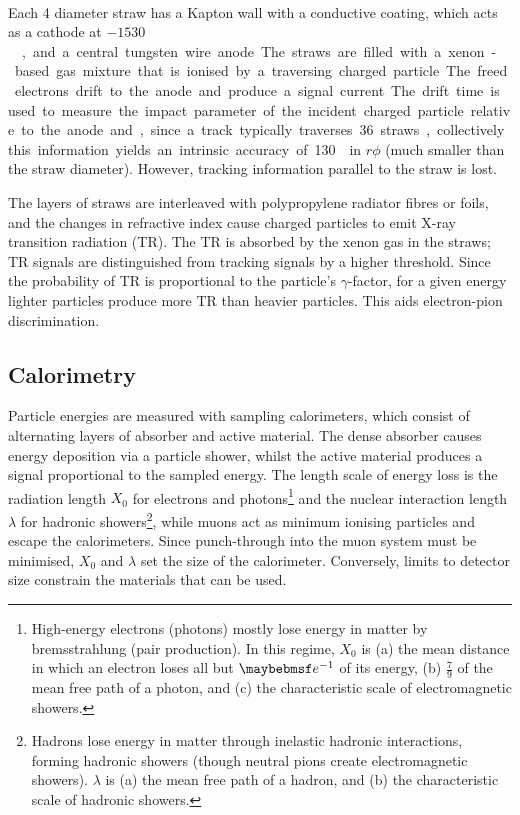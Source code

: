 \begin{description}
	Each \unit{4}{\milli\metre} diameter straw has a 
	Kapton\textsuperscript{\circledR}\xspace wall with a conductive coating, which 
	acts as a cathode at \unit{$-1530$}{\volt}, and a central tungsten wire anode. The 
	straws are filled with a xenon-based gas mixture that is ionised by a traversing 
	charged particle. The freed electrons drift to the anode and produce a signal current.
	The drift time is used to measure the impact parameter of the incident charged 
	particle relative to the anode and, since a track typically traverses 36 straws, 
	collectively this information yields an intrinsic accuracy of \unit{130}{\micro\metre}
	in $r\phi$ (much smaller than the straw diameter). However, tracking information 
	parallel to the straw is lost.

	The layers of straws are interleaved with polypropylene radiator fibres or foils, and 
	the changes in refractive index cause charged particles to emit X-ray transition 
	radiation (TR). The TR is absorbed by the xenon gas in the straws; TR signals are 
	distinguished from tracking signals by a higher threshold. Since the probability of 
	TR is proportional to the particle's $\gamma$-factor, for a given energy lighter 
	particles produce more TR than heavier particles. This aids electron-pion 
	discrimination.
\end{description}



\subsection{Calorimetry}

Particle energies are measured with sampling calorimeters, which consist of alternating 
layers of absorber and active material. The dense absorber causes energy deposition 
via a particle shower, whilst the active material produces a signal proportional to the 
sampled energy. The length scale of energy loss is the radiation length $X_0$ for 
electrons and photons\footnote{
	High-energy electrons (photons) mostly lose energy in matter by bremsstrahlung 
	(\epluseminus pair production). In this regime, $X_0$ is (a) the mean distance in 
	which an electron loses all but $\eexp{-1}$ of its energy, (b) $\tfrac{7}{9}$ of the 
	mean free path of a photon, and (c) the characteristic scale of electromagnetic 
	showers.
} and the nuclear interaction length $\lambda$ for hadronic showers\footnote{
	Hadrons lose energy in matter through inelastic hadronic interactions, forming hadronic showers (though neutral pions create electromagnetic showers). $\lambda$ is 
	(a) the mean free path of a hadron, and (b) the characteristic scale of hadronic showers.
}, while muons act as minimum ionising particles and escape the calorimeters. Since 
punch-through into the muon system must be minimised, $X_0$ and $\lambda$ set the size of 
the calorimeter. Conversely, limits to detector size constrain the materials that can be
used.

